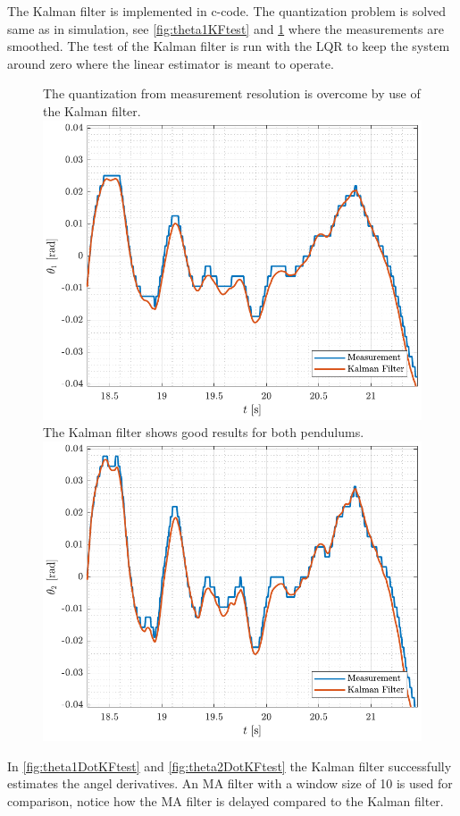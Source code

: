 %
The Kalman filter is implemented in c-code. The quantization problem is solved same as in simulation, see \autoref{fig:theta1KFtest} and \ref{fig:theta2KFtest} where the measurements are smoothed. The test of the Kalman filter is run with the LQR to keep the system around zero where the linear estimator is meant to operate.
%
%
\begin{figure}[H]
  \hspace{-10pt}
  \captionbox
  {
    The quantization from measurement resolution is overcome by use of the Kalman filter.
    \label{fig:theta1KFtest}
  }
  {
    \hspace{-1cm}
    \includegraphics[width=.5\textwidth]{figures/theta1KFtest}
  }
  \hspace{20pt}
  \captionbox 
  {
    The Kalman filter shows good results for both pendulums.
    \label{fig:theta2KFtest}
  }
  {
    \hspace{-1cm}
    \includegraphics[width=.5\textwidth]{figures/theta2KFtest}
  }  
\end{figure}
In \autoref{fig:theta1DotKFtest} and \ref{fig:theta2DotKFtest} the Kalman filter successfully estimates the angel derivatives. An MA filter with a window size of 10 is used for comparison, notice how the MA filter is delayed compared to the Kalman filter.
